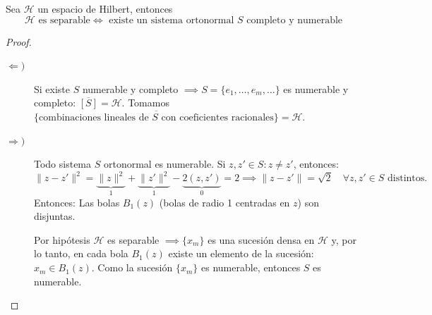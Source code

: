 \begin{teo} 
    Sea $\mathcal{H}$ un espacio de Hilbert, entonces
    \begin{equation*}
        \mathcal{H} \text{ es separable} \iff \text{ existe un sistema ortonormal } S \text{ completo y numerable}
    \end{equation*}
\begin{proof} %
    \begin{description}
        \item[$\Longleftarrow)$] Si existe $S$ numerable y completo $\implies S = \{e_1, \dots, e_m, \dots\}$ es numerable y completo: $\overline{[S]} = \mathcal{H}$.
        Tomamos $\overline{\{ \text{combinaciones lineales de } S \text{ con coeficientes racionales} \}} = \mathcal{H}$.
        \item[$\Longrightarrow)$] Todo sistema $S$ ortonormal es numerable. Si $z, z' \in S : z \neq z'$, entonces:
        \[ \|z - z'\|^2 = \underbrace{\|z\|^2}_{1} + \underbrace{\|z'\|^2}_{1} - \underbrace{2(z, z')}_{0} = 2 \implies \|z - z'\| = \sqrt{2} \quad \forall z, z' \in S \text{ distintos}. \]
        Entonces:
        Las bolas $B_1(z)$ (bolas de radio 1 centradas en $z$) son disjuntas.

        Por hipótesis $\mathcal{H}$ es separable $\implies \{x_m\}$ es una sucesión densa en $\mathcal{H}$ y, por lo tanto, en cada bola $B_1(z)$ existe un elemento de la sucesión: $x_m \in B_1(z)$.
        Como la sucesión $\{x_m\}$ es numerable, entonces $S$ es numerable.
    \end{description}
\end{proof}
\end{teo}

